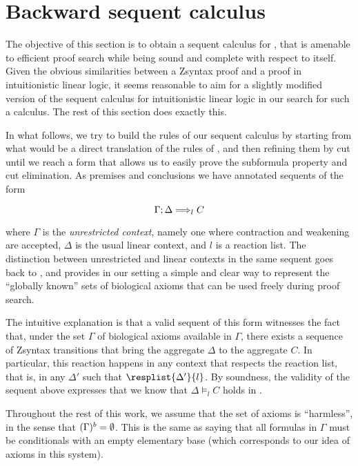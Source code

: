 \section{Backward sequent calculus}

The objective of this section is to obtain a sequent calculus for \eznd{}, that
is amenable to efficient proof search while being sound and complete with
respect to \eznd{} itself. Given the obvious similarities between a Zsyntax
proof and a proof in intuitionistic linear logic, it seems reasonable to aim for
a slightly modified version of the sequent calculus for intuitionistic linear
logic in our search for such a calculus. The rest of this section does exactly
this.

In what follows, we try to build the rules of our sequent calculus by starting
from what would be a direct translation of the rules of \eznd{}, and then
refining them by cut until we reach a form that allows us to easily prove the
subformula property and cut elimination. As premises and conclusions we have
annotated sequents of the form

\[
  \Gamma ; \Delta \Longrightarrow_{l} C
\]

where $\Gamma$ is the \emph{unrestricted context}, namely one where contraction
and weakening are accepted, $\Delta$ is the usual linear context, and $l$ is a
reaction list. The distinction between unrestricted and linear contexts in the
same sequent goes back to \cite{GIRARD1993201}, and provides in our setting a
simple and clear way to represent the ``globally known'' sets of biological
axioms that can be used freely during proof search.

The intuitive explanation is that a valid sequent of this form
witnesses the fact that, under the set $\Gamma$ of biological axioms available
in $\Gamma$, there exists a sequence of Zsyntax transitions that bring the
aggregate $\Delta$ to the aggregate $C$. In particular, this reaction happens in
any context that respects the reaction list, that is, in any $\Delta'$ such that
$\resplist{\Delta'}{l}$. By soundness, the validity of the sequent above
expresses that we know that $\Delta \models_{l} C$ holds in \eznd{}.

Throughout the rest of this work, we assume that the set of axioms is
``harmless'', in the sense that $(\Gamma)^{b} = \emptyset$.  This is the
same as saying that all formulas in $\Gamma$ must be conditionals with an empty
elementary base (which corresponds to our idea of axioms in this system).

